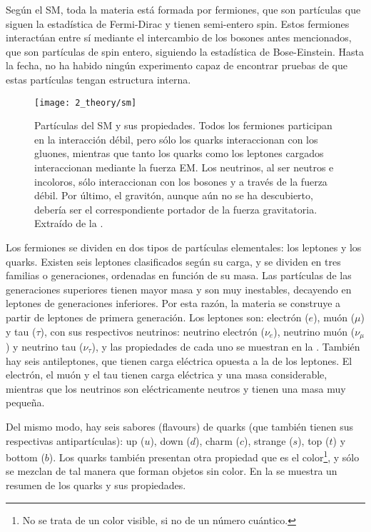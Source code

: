 Según el \ac{SM}, toda la materia está formada por fermiones, que son partículas que siguen la estadística de Fermi-Dirac y tienen semi-entero spin. Estos fermiones interactúan entre sí mediante el intercambio de los bosones antes mencionados, que son partículas de spin entero, siguiendo la estadística de Bose-Einstein. Hasta la fecha, no ha habido ningún experimento capaz de encontrar pruebas de que estas part\'iculas tengan estructura interna.

\begin{figure}[ht!]
    \centering
    \texttt{[image: 2\_theory/sm]}
    \caption{Part\'iculas del \ac{SM} y sus propiedades. Todos los fermiones participan en la interacción débil, pero sólo los quarks interaccionan con los gluones, mientras que tanto los quarks como los leptones cargados interaccionan mediante la fuerza \ac{EM}. Los neutrinos, al ser neutros e incoloros, sólo interaccionan con los bosones \Wboson y \Zboson a través de la fuerza débil. Por último, el gravitón, aunque aún no se ha descubierto, debería ser el correspondiente portador de la fuerza gravitatoria. Extraído de la .}
    \label{fig:theory:sm:particles_interaction:particles}
\end{figure}

Los fermiones se dividen en dos tipos de partículas elementales: los leptones y los quarks. Existen seis leptones clasificados según su carga, y se dividen en tres familias o generaciones, ordenadas en función de su masa. Las partículas de las generaciones superiores tienen mayor masa y son muy inestables, decayendo en leptones de generaciones inferiores. Por esta razón, la materia se construye a partir de leptones de primera generación. Los leptones son: electrón (\(e\)), muón (\(\mu\)) y tau (\(\tau\)), con sus respectivos neutrinos: neutrino electrón (\(\nu_{e}\)), neutrino muón (\(\nu_{\mu}\)) y neutrino tau (\(\nu_{\tau}\)), y las propiedades de cada uno se muestran en la \Fig{\ref{fig:theory:sm:particles_interaction:particles}}.
También hay seis antileptones, que tienen carga el\'ectrica opuesta a la de los leptones. El electrón, el muón y el tau tienen carga eléctrica y una masa considerable, mientras que los neutrinos son eléctricamente neutros y tienen una masa muy pequeña.

Del mismo modo, hay seis sabores (flavours) de quarks (que también tienen sus respectivas antipartículas): up (\(u\)), down (\(d\)), charm (\(c\)), strange (\(s\)), top (\(t\)) y bottom (\(b\)). Los quarks también presentan otra propiedad que es el color\footnote{No se trata de un color visible, si no de un n\'umero cu\'antico.}, y sólo se mezclan de tal manera que forman objetos sin color. En la \Fig{\ref{fig:theory:sm:particles_interaction:particles}} se muestra un resumen de los quarks y sus propiedades.


